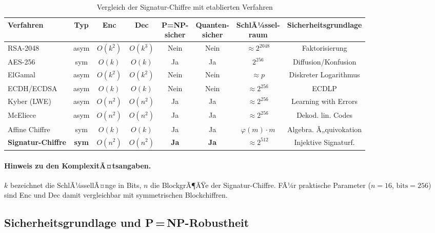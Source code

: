 ﻿\documentclass[a4paper,12pt]{scrreprt}
\theoremstyle{definition}
\begin{document}
\begin{table}
\centering
\caption{Vergleich der Signatur-Chiffre mit etablierten Verfahren}
\label{tab:vergleich2}
\begin{tabular}{@{}lccccccc@{}}
\toprule
\textbf{Verfahren} & \textbf{Typ} & \textbf{Enc} & \textbf{Dec}
  & \makecell{\textbf{P=NP-}\\\textbf{sicher}}
  & \makecell{\textbf{Quanten-}\\\textbf{sicher}}
  & \makecell{\textbf{SchlÃ¼ssel-}\\\textbf{raum}}
  & \textbf{Sicherheitsgrundlage} \\
\midrule
RSA-2048 \cite{Riv78}        & asym & $O(k^2)$ & $O(k^3)$ & Nein & Nein & $\approx 2^{2048}$ & Faktorisierung \\
AES-256 \cite{DR02}          & sym  & $O(k)$   & $O(k)$   & Ja   & Ja   & $2^{256}$          & Diffusion/Konfusion \\
ElGamal \cite{ElG85}         & asym & $O(k^2)$ & $O(k^2)$ & Nein & Nein & $\approx p$        & Diskreter Logarithmus \\
ECDH/ECDSA                   & asym & $O(k)$   & $O(k)$   & Nein & Nein & $\approx 2^{256}$  & ECDLP \\
Kyber (LWE) \cite{ABD+22}    & asym & $O(n^2)$ & $O(n^2)$ & Ja   & Ja   & $\approx 2^{256}$  & Learning with Errors \\
McEliece \cite{McE78}        & asym & $O(n^2)$ & $O(n^2)$ & Ja   & Ja   & $\approx 2^{256}$  & Dekod. lin. Codes \\
Affine Chiffre \cite{Epp26c} & sym  & $O(k)$   & $O(k)$   & Ja   & Ja   & $\varphi(m)\cdot m$ & Algebra. Ã„quivokation \\
\midrule
\textbf{Signatur-Chiffre}    & \textbf{sym} & $O(n^2)$ & $O(n^2)$ & \textbf{Ja} & \textbf{Ja} & $\approx 2^{512}$ & Injektive Signaturf. \\
\bottomrule
\end{tabular}
\end{table}

\paragraph{Hinweis zu den KomplexitÃ¤tsangaben.}
$k$ bezeichnet die SchlÃ¼ssellÃ¤nge in Bits, $n$ die BlockgrÃ¶ÃŸe der Signatur-Chiffre. FÃ¼r praktische Parameter ($n=16$, $\mathrm{bits}=256$) sind Enc und Dec damit vergleichbar mit symmetrischen Blockchiffren.

\subsection{Sicherheitsgrundlage und P\,=\,NP-Robustheit}
\end{document}
